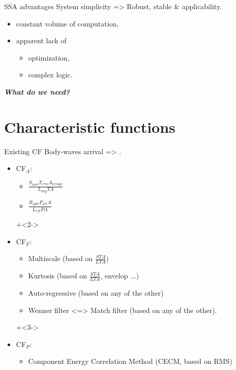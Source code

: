 \documentclass[10pt]{beamer}
\begin{document}
\begin{frame}{SSA advantages}
  System simplicity => Robust, stable \& applicability.
  \begin{itemize}
    \item constant volume of computation, 
    \item apparent lack of 
    \begin{itemize}
      \item optimization, 
      \item complex logic.
    \end{itemize}
  \end{itemize}
  \textbf{\textit{What do we need?}}
  \end{frame}

\section{Characteristic functions}

\begin{frame}{Existing CF}
  Body-waves arrival => .
  \begin{itemize}
    \item CF\alert{$_{A}$}: 
      \begin{itemize}
        \item $\frac{S_{hort}T_{erm}A_{verage}}{L_{ong}TA}$  
        \item $\frac{R_{ight}P_{art}A}{L_{eft}PA}$  
      \end{itemize}
    \onslide+<2->
    \item CF\alert{$_{F}$}: 
      \begin{itemize}
        \item Multiscale (based on $\frac{STA}{LTA}$) 
        \item Kurtosis (based on $\frac{STA}{LTA}$, envelop ...)
        \item Auto-regressive (based on any of the other)
        \item Wenner filter <=> Match filter (based on any of the other).
      \end{itemize}
    \onslide+<3->
    \item CF\alert{$_{P}$}: 
      \begin{itemize}
        \item Component Energy Correlation Method (CECM\cite{Nagano:1989ws}, based on RMS)
      \end{itemize}
  \end{itemize}
\end{frame}
\end{document}
